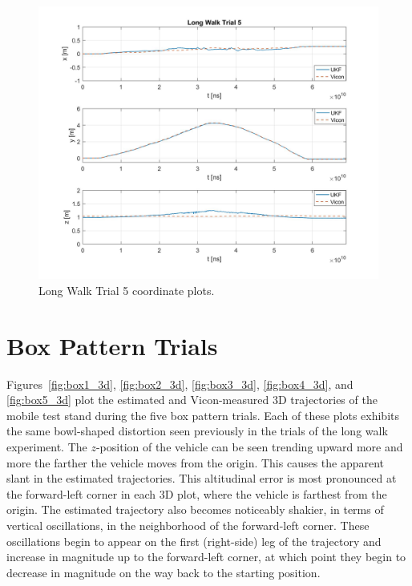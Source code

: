 \begin{figure}[p]
  \centering
    \includegraphics[width=\textwidth]{longWalk5_xyz}
  \caption[Long Walk Trial 5]{Long Walk Trial 5 coordinate plots.}
  \label{fig:longWalk5_xyz}
\end{figure}
\clearpage

\section{Box Pattern Trials}

Figures~\ref{fig:box1_3d}, \ref{fig:box2_3d}, \ref{fig:box3_3d}, \ref{fig:box4_3d}, and \ref{fig:box5_3d} plot the estimated and Vicon-measured 3D trajectories of the mobile test stand during the five box pattern trials. Each of these plots exhibits the same bowl-shaped distortion seen previously in the trials of the long walk experiment. The $z$-position of the vehicle can be seen trending upward more and more the farther the vehicle moves from the origin. This causes the apparent slant in the estimated trajectories. This altitudinal error is most pronounced at the forward-left corner in each 3D plot, where the vehicle is farthest from the origin. The estimated trajectory also becomes noticeably shakier, in terms of vertical oscillations, in the neighborhood of the forward-left corner. These oscillations begin to appear on the first (right-side) leg of the trajectory and increase in magnitude up to the forward-left corner, at which point they begin to decrease in magnitude on the way back to the starting position.

